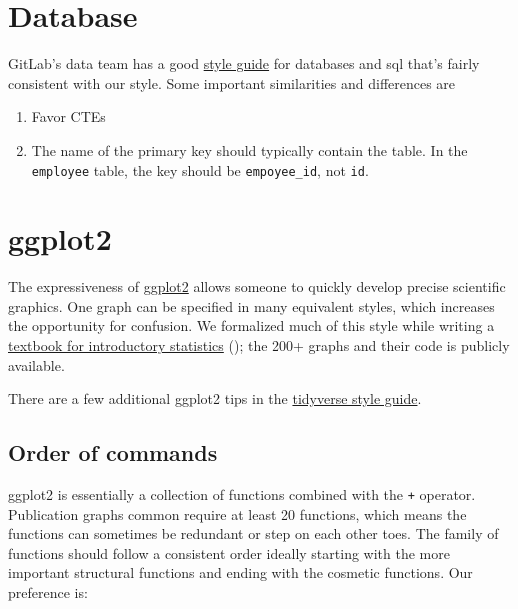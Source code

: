 \documentclass[
]{book}
\begin{document}
\hypertarget{style-database}{%
\section{Database}\label{style-database}}

GitLab's data team has a good \href{https://about.gitlab.com/handbook/business-ops/data-team/sql-style-guide/}{style guide} for databases and sql that's fairly consistent with our style. Some important similarities and differences are

\begin{enumerate}
\def\labelenumi{\arabic{enumi}.}
\item
  Favor CTEs
\item
  The name of the primary key should typically contain the table. In the \texttt{employee} table, the key should be \texttt{empoyee\_id}, not \texttt{id}.
\end{enumerate}

\hypertarget{style-ggplot}{%
\section{ggplot2}\label{style-ggplot}}

The expressiveness of \href{https://ggplot2.tidyverse.org/}{ggplot2} allows someone to quickly develop precise scientific graphics. One graph can be specified in many equivalent styles, which increases the opportunity for confusion. We formalized much of this style while writing a \href{https://github.com/OuhscBbmc/DeSheaToothakerIntroStats/blob/master/thumbnails/thumbnails.md}{textbook for introductory statistics} (\citet{deshea}); the 200+ graphs and their code is publicly available.

There are a few additional ggplot2 tips in the \href{https://style.tidyverse.org/ggplot2.html}{tidyverse style guide}.

\hypertarget{style-ggplot-order}{%
\subsection{Order of commands}\label{style-ggplot-order}}

ggplot2 is essentially a collection of functions combined with the \texttt{+} operator. Publication graphs common require at least 20 functions, which means the functions can sometimes be redundant or step on each other toes. The family of functions should follow a consistent order ideally starting with the more important structural functions and ending with the cosmetic functions. Our preference is:
\end{document}

